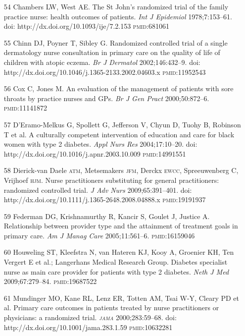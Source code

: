 \documentclass{article}
\begin{document}
\begin{itemize}
\item[54] Chambers LW, West AE. The St John’s randomized trial of the family
practice nurse:
health outcomes of patients. \textit{Int J Epidemiol}
1978;7:153–61. doi:
http://dx.doi.org/10.1093/ije/7.2.153 \textsc{pmid}:681061

\item[55] Chinn DJ, Poyner T, Sibley G. Randomized controlled trial of a single
dermatology
nurse consultation in primary care on the quality of life of children with
atopic eczema. \textit{Br
J Dermatol}
2002;146:432–9. doi: http://dx.doi.org/10.1046/j.1365-2133.2002.04603.x
\textsc{pmid}:11952543

\item[56] Cox C, Jones M. An evaluation of the management of patients with sore
throats by
practice nurses and GPs. \textit{Br J Gen Pract}
2000;50:872–6.
\textsc{pmid}:11141872

\item[57] D'Eramo-Melkus G, Spollett G, Jefferson V, Chyun D, Tuohy B, Robinson
T et
al. A culturally competent intervention of education and care for black women
with type 2 diabetes.
\textit{Appl Nurs Res}
2004;17:10–20. doi: http://dx.doi.org/10.1016/j.apnr.2003.10.009
\textsc{pmid}:14991551

\item[58] Dierick-van Daele \textsc{atm}, Metsemakers \textsc{jfm}, Derckx \textsc{ewcc}, Spreeuwenberg C,
Vrijhoef \textsc{hjm}.
Nurse practitioners substituting for general practitioners: randomized
controlled trial. \textit{J
Adv Nurs}
2009;65:391–401. doi: http://dx.doi.org/10.1111/j.1365-2648.2008.04888.x
\textsc{pmid}:19191937

\item[59] Federman DG, Krishnamurthy R, Kancir S, Goulet J, Justice A.
Relationship between
provider type and the attainment of treatment goals in primary care. \textit{Am
J Manag
Care}
2005;11:561–6. \textsc{pmid}:16159046

\item[60] Houweling ST, Kleefstra N, van Hateren KJ, Kooy A, Groenier KH, Ten
Vergert E et
al.; Langerhans Medical Research Group. Diabetes specialist nurse as main care
provider for patients
with type 2 diabetes. \textit{Neth J Med}
2009;67:279–84. \textsc{pmid}:19687522

\item[61] Mundinger MO, Kane RL, Lenz ER, Totten AM, Tsai W-Y, Cleary PD et al.
Primary care
outcomes in patients treated by nurse practitioners or physicians: a randomized
trial.
\textit{\textsc{jama}}
2000;283:59–68. doi: http://dx.doi.org/10.1001/jama.283.1.59
\textsc{pmid}:10632281


\end{itemize}
\end{document}
